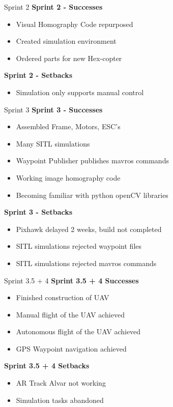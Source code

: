 \documentclass[11pt]{beamer}
\begin{document}
 
 \begin{frame}{Sprint 2}
	\large{\textbf{Sprint 2 - Successes}}
	\begin{itemize}
		\item Visual Homography Code repurposed
		\item Created simulation environment
		\item Ordered parts for new Hex-copter
	\end{itemize}
	\large{\textbf{Sprint 2 - Setbacks}}
	\begin{itemize}
		\item Simulation only supports manual control
	\end{itemize}
 \end{frame}
 
 
 \begin{frame}{Sprint 3}
	\large{\textbf{Sprint 3 - Successes}}
	\begin{itemize}
		\item Assembled Frame, Motors, ESC's
		\item Many SITL simulations
		\item Waypoint Publisher publishes mavros commands
		\item Working image homography code
		\item Becoming familiar with python openCV libraries
	\end{itemize}
	\large{\textbf{Sprint 3 - Setbacks}}
	\begin{itemize}
		\item Pixhawk delayed 2 weeks, build not completed
		\item SITL simulations rejected waypoint files
		\item SITL simulations rejected mavros commands
	\end{itemize}
 \end{frame}
 
 \begin{frame}{Sprint 3.5 + 4}
 	\large{\textbf{Sprint 3.5 + 4 Successes}}
 	\begin{itemize}
 		\item Finished construction of UAV
 		\item Manual flight of the UAV achieved
 		\item Autonomous flight of the UAV achieved
 		\item GPS Waypoint navigation achieved
 	\end{itemize}
 	\large{\textbf{Sprint 3.5 + 4 Setbacks}}
 	\begin{itemize}
 		\item AR Track Alvar not working
 		\item Simulation tasks abandoned
 	\end{itemize}
 \end{frame}
 
\end{document}
